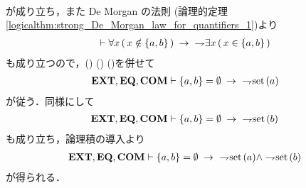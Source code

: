 \begin{sketch}
\begin{align}
		\end{align}
		が成り立ち，また De Morgan の法則
		(論理的定理\ref{logicalthm:strong_De_Morgan_law_for_quantifiers_1})より
		\begin{align}
			\vdash \forall x\, (\, x \notin \{a,b\}\, ) \rarrow\ \negation \exists x\, (\, x \in \{a,b\}\, )
			\label{fom:classes_displayed_in_empty_pair_are_not_sets_3}
		\end{align}
		も成り立つので，()
		()
		()を併せて
		\begin{align}
			\EXTAX,\EQAX,\COMAX \vdash \{a,b\} = \emptyset \rarrow\ \negation \set{a}
		\end{align}
		が従う．同様にして
		\begin{align}
			\EXTAX,\EQAX,\COMAX \vdash \{a,b\} = \emptyset \rarrow\ \negation \set{b}
		\end{align}
		も成り立ち，論理積の導入より
		\begin{align}
			\EXTAX,\EQAX,\COMAX \vdash \{a,b\} = \emptyset \rarrow\ \negation \set{a} \wedge \negation \set{b}
		\end{align}
		が得られる．
		\QED
	\end{sketch}